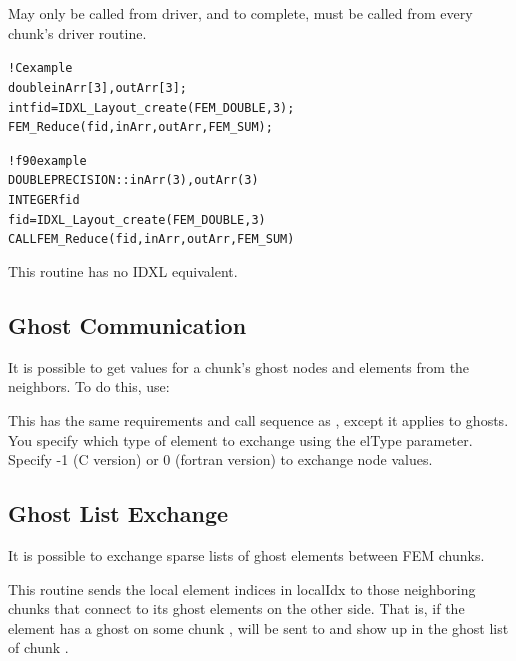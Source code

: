 \documentclass[10pt]{article}
\begin{document}
     May only be called from driver, and to complete, must be called
     from every chunk's driver routine.

\begin{alltt}
! C example
   double inArr[3], outArr[3];
   int fid=IDXL_Layout_create(FEM_DOUBLE,3);
   FEM_Reduce(fid,inArr,outArr,FEM_SUM);

! f90 example
   DOUBLE PRECISION :: inArr(3), outArr(3)
   INTEGER fid
   fid=IDXL_Layout_create(FEM_DOUBLE,3)
   CALL FEM_Reduce(fid,inArr,outArr,FEM_SUM)
\end{alltt}

     This routine has no IDXL equivalent.


\subsection{Ghost Communication}

It is possible to get values for a chunk's ghost nodes and elements from the neighbors. To do this, use:


This has the same requirements and call sequence as , except it applies to ghosts. You specify which type of element to exchange using the elType parameter. Specify -1 (C version) or 0 (fortran version) to exchange node values.  


\subsection{Ghost List Exchange}

It is possible to exchange sparse lists of ghost elements between FEM chunks.


This routine sends the local element indices in localIdx to those neighboring chunks that connect to its ghost elements on the other side.  That is, if the element
 has a ghost on some chunk ,  will be sent to 
and show up in the ghost list of chunk .
\end{document}
